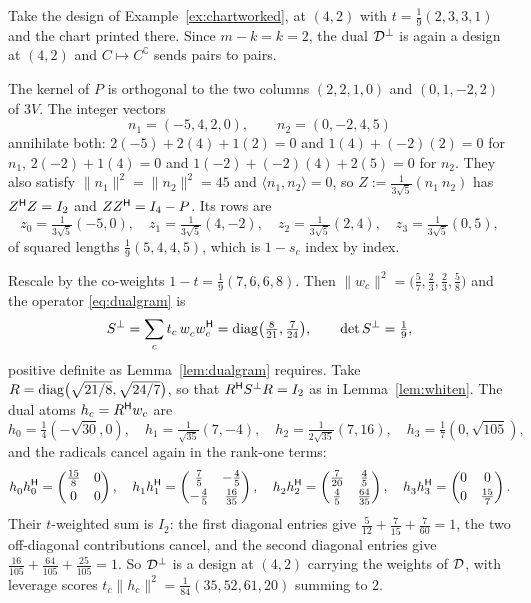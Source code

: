 \begin{example}
Take the design of Example~\ref{ex:chartworked}, at $(4,2)$ with
$t=\tfrac19(2,3,3,1)$ and the chart printed there.  Since $m-k=k=2$, the
dual $\mathcal{D}^{\perp}$ is again a design at $(4,2)$ and
$C\mapsto C^{\complement}$ sends pairs to pairs.

The kernel of $P$ is orthogonal to the two columns $(2,2,1,0)$ and
$(0,1,-2,2)$ of $3V$.  The integer vectors
\[
  n_1=(-5,4,2,0),\qquad n_2=(0,-2,4,5)
\]
annihilate both: $2(-5)+2(4)+1(2)=0$ and $1(4)+(-2)(2)=0$ for $n_1$,
$2(-2)+1(4)=0$ and $1(-2)+(-2)(4)+2(5)=0$ for $n_2$.  They also satisfy
$\lVert n_1\rVert^2=\lVert n_2\rVert^2=45$ and $\langle n_1,n_2\rangle=0$,
so $Z:=\tfrac1{3\sqrt5}(n_1\ n_2)$ has $Z^{\mathsf{H}} Z=I_2$ and
$ZZ^{\mathsf{H}}=I_4-P$.  Its rows are
\[
  z_0=\tfrac1{3\sqrt5}(-5,0),\quad
  z_1=\tfrac1{3\sqrt5}(4,-2),\quad
  z_2=\tfrac1{3\sqrt5}(2,4),\quad
  z_3=\tfrac1{3\sqrt5}(0,5),
\]
of squared lengths $\tfrac19(5,4,4,5)$, which is $1-s_c$ index by index.

Rescale by the co-weights $1-t=\tfrac19(7,6,6,8)$.  Then
$\lVert w_c\rVert^2=\bigl(\tfrac57,\tfrac23,\tfrac23,\tfrac58\bigr)$ and
the operator \eqref{eq:dualgram} is
\[
  \Sdual=\sum_c t_c\,w_c^{\vphantom{\mathsf{H}}}w_c\adj
    =\diag\bigl(\tfrac8{21},\tfrac7{24}\bigr),
  \qquad \det\Sdual=\tfrac19,
\]
positive definite as Lemma~\ref{lem:dualgram} requires.  Take
$R=\operatorname{diag}\bigl(\sqrt{21/8},\sqrt{24/7}\bigr)$, so that $R^{\mathsf{H}}S^{\perp} R=I_2$
as in Lemma~\ref{lem:whiten}.  The dual atoms $h_c=R^{\mathsf{H}} w_c$ are
\[
  h_0=\tfrac14(-\sqrt{30},0),\quad
  h_1=\tfrac1{\sqrt{35}}(7,-4),\quad
  h_2=\tfrac1{2\sqrt{35}}(7,16),\quad
  h_3=\tfrac17(0,\sqrt{105}),
\]
and the radicals cancel again in the rank-one terms:
\[
  h_0^{\vphantom{\mathsf{H}}}h_0\adj
    =\begin{pmatrix}\tfrac{15}8&0\\[2pt]0&0\end{pmatrix},
  \quad
  h_1^{\vphantom{\mathsf{H}}}h_1\adj
    =\begin{pmatrix}\tfrac75&-\tfrac45\\[2pt]
                    -\tfrac45&\tfrac{16}{35}\end{pmatrix},
  \quad
  h_2^{\vphantom{\mathsf{H}}}h_2\adj
    =\begin{pmatrix}\tfrac7{20}&\tfrac45\\[2pt]
                    \tfrac45&\tfrac{64}{35}\end{pmatrix},
  \quad
  h_3^{\vphantom{\mathsf{H}}}h_3\adj
    =\begin{pmatrix}0&0\\[2pt]0&\tfrac{15}7\end{pmatrix}.
\]
Their $t$-weighted sum is $I_2$: the first diagonal entries give
$\tfrac5{12}+\tfrac7{15}+\tfrac7{60}=1$, the two off-diagonal
contributions cancel, and the second diagonal entries give
$\tfrac{16}{105}+\tfrac{64}{105}+\tfrac{25}{105}=1$.  So $\mathcal{D}^{\perp}$ is
a design at $(4,2)$ carrying the weights of $\mathcal{D}$, with leverage scores
$t_c\lVert h_c\rVert^2=\tfrac1{84}(35,52,61,20)$ summing to $2$.


\end{example}
